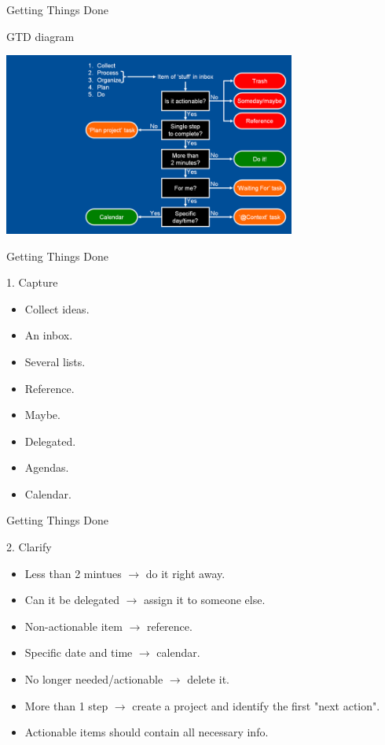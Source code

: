 \begin{frame}{Getting Things Done}
  \begin{block}{GTD diagram}
    \begin{center}
      \includegraphics[height=6cm]{img/gtd-diagram.png}
    \end{center}
  \end{block}
\end{frame}

\begin{frame}{Getting Things Done}
  \begin{block}{1. Capture}
    \begin{itemize}
      \item Collect ideas.
      \item An inbox. %
      \item Several lists. %
      \item Reference.
      \item Maybe.
      \item Delegated.
      \item Agendas.
      \item Calendar.
    \end{itemize}
  \end{block}
\end{frame}

\begin{frame}{Getting Things Done}
  \begin{block}{2. Clarify}
    \begin{itemize}
      \item Less than 2 mintues $\rightarrow$ do it right away.
      \item Can it be delegated $\rightarrow$ assign it to someone else.
      \item Non-actionable item $\rightarrow$ reference. %
      \item Specific date and time $\rightarrow$ calendar.
      \item No longer needed/actionable $\rightarrow$ delete it.
      \item More than 1 step $\rightarrow$ create a project and identify the first "next action". %
      \item Actionable items should contain all necessary info. %
    \end{itemize}
  \end{block}
\end{frame}

